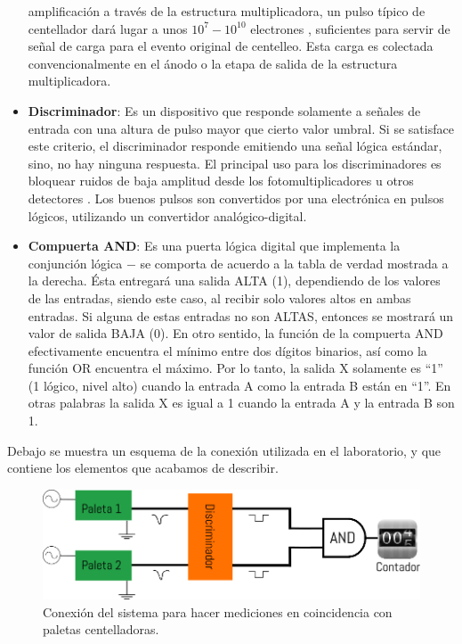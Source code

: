 \documentclass[a4paper,10pt]{article}
\numberwithin{equation}{section}
\begin{document}
\begin{itemize}
 amplificación a través de la estructura multiplicadora, un pulso típico de
 centellador dará lugar a unos $10^7-10^{10}$ electrones \cite{knoll}, suficientes
 para servir de señal de carga para el evento original de centelleo. Esta carga
 es colectada convencionalmente en el ánodo o la etapa de salida de la estructura
 multiplicadora.
 \item \textbf{Discriminador}: Es un dispositivo que responde solamente a señales 
 de entrada con una altura de pulso mayor que cierto valor umbral. Si se satisface 
 este criterio, el discriminador responde emitiendo una señal lógica estándar, sino, 
 no hay ninguna respuesta. El principal uso para los discriminadores es bloquear 
 ruidos de baja amplitud desde los fotomultiplicadores u otros detectores \cite{leo}. Los 
 buenos pulsos son convertidos por una electrónica en pulsos lógicos, utilizando 
 un convertidor analógico-digital.
 \item \textbf{Compuerta AND}: Es una puerta lógica digital que implementa la
 conjunción lógica $-$ se comporta de acuerdo a la tabla de verdad mostrada a la 
 derecha. Ésta entregará una salida ALTA (1), dependiendo de los valores de las 
 entradas, siendo este caso, al recibir solo valores altos en ambas entradas. Si 
 alguna de estas entradas no son ALTAS, entonces se mostrará un valor de salida 
 BAJA (0). En otro sentido, la función de la compuerta AND efectivamente encuentra 
 el mínimo entre dos dígitos binarios, así como la función OR encuentra el máximo.
 Por lo tanto, la salida X solamente es ``1'' (1 lógico, nivel alto) cuando la entrada
 A como la entrada B están en ``1''. En otras palabras la salida X es igual a 1 cuando
 la entrada A y la entrada B son 1.
\end{itemize}

Debajo se muestra un esquema de la conexión utilizada en el laboratorio, y que 
contiene los elementos que acabamos de describir.

\begin{figure}[H]
 \center 
 \includegraphics[scale=0.4]{sistema}
 \caption{Conexión del sistema para hacer mediciones en coincidencia con paletas 
 centelladoras.}
 \label{fig:sistema}
\end{figure}
\end{document}
